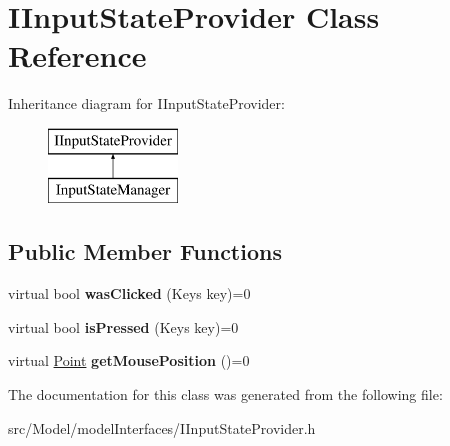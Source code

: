 \hypertarget{classIInputStateProvider}{}\section{I\+Input\+State\+Provider Class Reference}
\label{classIInputStateProvider}
Inheritance diagram for I\+Input\+State\+Provider\+:\begin{figure}[H]
\begin{center}
\leavevmode
\includegraphics[height=2.000000cm]{classIInputStateProvider}
\end{center}
\end{figure}
\subsection*{Public Member Functions}
\begin{DoxyCompactItemize}
\item 
virtual bool {\bfseries was\+Clicked} (Keys key)=0\hypertarget{classIInputStateProvider_a6c97f490d462dadd588acb63963c7f47}{}\label{classIInputStateProvider_a6c97f490d462dadd588acb63963c7f47}

\item 
virtual bool {\bfseries is\+Pressed} (Keys key)=0\hypertarget{classIInputStateProvider_a48b11ddcc2c98525b0815fcc0970439d}{}\label{classIInputStateProvider_a48b11ddcc2c98525b0815fcc0970439d}

\item 
virtual \hyperlink{classPoint}{Point} {\bfseries get\+Mouse\+Position} ()=0\hypertarget{classIInputStateProvider_a46d95d5517d1bef12b0820508d0bafed}{}\label{classIInputStateProvider_a46d95d5517d1bef12b0820508d0bafed}

\end{DoxyCompactItemize}


The documentation for this class was generated from the following file\+:\begin{DoxyCompactItemize}
\item 
src/\+Model/model\+Interfaces/I\+Input\+State\+Provider.\+h\end{DoxyCompactItemize}
